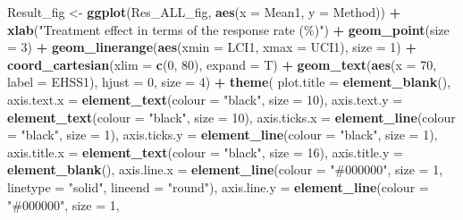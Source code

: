 \documentclass[
]{article}
\newenvironment{Shaded}{\begin{snugshade}}{\end{snugshade}}
\newcommand{\AttributeTok}[1]{\textcolor[rgb]{0.13,0.29,0.53}{#1}}
\newcommand{\DecValTok}[1]{\textcolor[rgb]{0.00,0.00,0.81}{#1}}
\newcommand{\FunctionTok}[1]{\textcolor[rgb]{0.13,0.29,0.53}{\textbf{#1}}}
\newcommand{\NormalTok}[1]{#1}
\newcommand{\OtherTok}[1]{\textcolor[rgb]{0.56,0.35,0.01}{#1}}
\newcommand{\SpecialCharTok}[1]{\textcolor[rgb]{0.81,0.36,0.00}{\textbf{#1}}}
\newcommand{\StringTok}[1]{\textcolor[rgb]{0.31,0.60,0.02}{#1}}
\begin{document}
\begin{Shaded}
\begin{Highlighting}[]
\NormalTok{Result\_fig }\OtherTok{\textless{}{-}} \FunctionTok{ggplot}\NormalTok{(Res\_ALL\_fig, }\FunctionTok{aes}\NormalTok{(}\AttributeTok{x =}\NormalTok{ Mean1, }\AttributeTok{y =}\NormalTok{ Method)) }\SpecialCharTok{+}
  \FunctionTok{xlab}\NormalTok{(}\StringTok{"Treatment effect in terms of the response rate (\%)"}\NormalTok{) }\SpecialCharTok{+}
  \FunctionTok{geom\_point}\NormalTok{(}\AttributeTok{size =} \DecValTok{3}\NormalTok{) }\SpecialCharTok{+}
  \FunctionTok{geom\_linerange}\NormalTok{(}\FunctionTok{aes}\NormalTok{(}\AttributeTok{xmin =}\NormalTok{ LCI1, }\AttributeTok{xmax =}\NormalTok{ UCI1), }\AttributeTok{size =} \DecValTok{1}\NormalTok{) }\SpecialCharTok{+}
  \FunctionTok{coord\_cartesian}\NormalTok{(}\AttributeTok{xlim =} \FunctionTok{c}\NormalTok{(}\DecValTok{0}\NormalTok{, }\DecValTok{80}\NormalTok{), }\AttributeTok{expand =}\NormalTok{ T) }\SpecialCharTok{+}
  \FunctionTok{geom\_text}\NormalTok{(}\FunctionTok{aes}\NormalTok{(}\AttributeTok{x =} \DecValTok{70}\NormalTok{, }\AttributeTok{label =}\NormalTok{ EHSS1), }\AttributeTok{hjust =} \DecValTok{0}\NormalTok{, }\AttributeTok{size =} \DecValTok{4}\NormalTok{) }\SpecialCharTok{+}
  \FunctionTok{theme}\NormalTok{(}
    \AttributeTok{plot.title =} \FunctionTok{element\_blank}\NormalTok{(),}
    \AttributeTok{axis.text.x =} \FunctionTok{element\_text}\NormalTok{(}\AttributeTok{colour =} \StringTok{"black"}\NormalTok{, }\AttributeTok{size =} \DecValTok{10}\NormalTok{),}
    \AttributeTok{axis.text.y =} \FunctionTok{element\_text}\NormalTok{(}\AttributeTok{colour =} \StringTok{"black"}\NormalTok{, }\AttributeTok{size =} \DecValTok{10}\NormalTok{),}
    \AttributeTok{axis.ticks.x =} \FunctionTok{element\_line}\NormalTok{(}\AttributeTok{colour =} \StringTok{"black"}\NormalTok{, }\AttributeTok{size =} \DecValTok{1}\NormalTok{),}
    \AttributeTok{axis.ticks.y =} \FunctionTok{element\_line}\NormalTok{(}\AttributeTok{colour =} \StringTok{"black"}\NormalTok{, }\AttributeTok{size =} \DecValTok{1}\NormalTok{),}
    \AttributeTok{axis.title.x =} \FunctionTok{element\_text}\NormalTok{(}\AttributeTok{colour =} \StringTok{"black"}\NormalTok{, }\AttributeTok{size =} \DecValTok{16}\NormalTok{),}
    \AttributeTok{axis.title.y =} \FunctionTok{element\_blank}\NormalTok{(),}
    \AttributeTok{axis.line.x =} \FunctionTok{element\_line}\NormalTok{(}\AttributeTok{colour =} \StringTok{"\#000000"}\NormalTok{, }\AttributeTok{size =} \DecValTok{1}\NormalTok{, }
                          \AttributeTok{linetype =} \StringTok{"solid"}\NormalTok{, }\AttributeTok{lineend =} \StringTok{"round"}\NormalTok{),}
    \AttributeTok{axis.line.y =} \FunctionTok{element\_line}\NormalTok{(}\AttributeTok{colour =} \StringTok{"\#000000"}\NormalTok{, }\AttributeTok{size =} \DecValTok{1}\NormalTok{, }

\end{Highlighting}
\end{Shaded}
\end{document}
